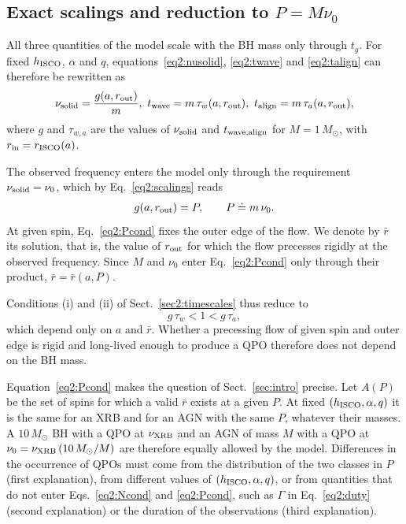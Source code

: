 \subsection{Exact scalings and reduction to $P=M\nu_0$}
\label{sec2:scaling}

All three quantities of the model scale with the BH mass only through $t_g$.
For fixed $h_\textup{ISCO}$, $\alpha$ and $q$, equations~\eqref{eq2:nusolid}, \eqref{eq2:twave} and \eqref{eq2:talign} can therefore be rewritten as
\begin{equation}
    \label{eq2:scalings}
    \nu_\textup{solid}=\frac{g(a,r_\textup{out})}{m},\ 
    t_\textup{wave}=m\,\tau_w(a,r_\textup{out}),\ 
    t_\textup{align}=m\,\tau_a(a,r_\textup{out}),
\end{equation}
where $g$ and $\tau_{w,a}$ are the values of $\nu_\textup{solid}$ and $t_\textup{wave,align}$ for $M=1\,M_\odot$, with $r_\textup{in}=r_\textup{ISCO}(a)$.

The observed frequency enters the model only through the requirement $\nu_\textup{solid}=\nu_0$, which by Eq.~\eqref{eq2:scalings} reads
\begin{equation}
    \label{eq2:Pcond}
    g(a,r_\textup{out})=P,\qquad P\doteq m\,\nu_0 .
\end{equation}
At given spin, Eq.~\eqref{eq2:Pcond} fixes the outer edge of the flow.
We denote by $\bar r$ its solution, that is, the value of $r_\textup{out}$ for which the flow precesses rigidly at the observed frequency.
Since $M$ and $\nu_0$ enter Eq.~\eqref{eq2:Pcond} only through their product, $\bar r=\bar r(a,P)$.

Conditions (i) and (ii) of Sect.~\ref{sec2:timescales} thus reduce to
\begin{equation}
    \label{eq2:Ncond}
    g\,\tau_w<1<g\,\tau_a,
\end{equation}
which depend only on $a$ and $\bar r$.
Whether a precessing flow of given spin and outer edge is rigid and long-lived enough to produce a QPO therefore does not depend on the BH mass.

Equation~\eqref{eq2:Pcond} makes the question of Sect.~\ref{sec:intro} precise.
Let $A(P)$ be the set of spins for which a valid $\bar r$ exists at a given $P$.
At fixed $(h_\textup{ISCO},\alpha, q)$ it is the same for an XRB and for an AGN with the same $P$, whatever their masses.
A $10\,M_\odot$ BH with a QPO at $\nu_\textup{XRB}$ and an AGN of mass $M$ with a QPO at $\nu_0=\nu_\textup{XRB}\,(10\,M_\odot/M)$ are therefore equally allowed by the model.
Differences in the occurrence of QPOs must come from the distribution of the two classes in $P$ (first explanation), from different values of $(h_\textup{ISCO},\alpha, q)$, or from quantities that do not enter Eqs.~\eqref{eq2:Ncond} and \eqref{eq2:Pcond}, such as $\Gamma$ in Eq.~\eqref{eq2:duty} (second explanation) or the duration of the observations (third explanation).


